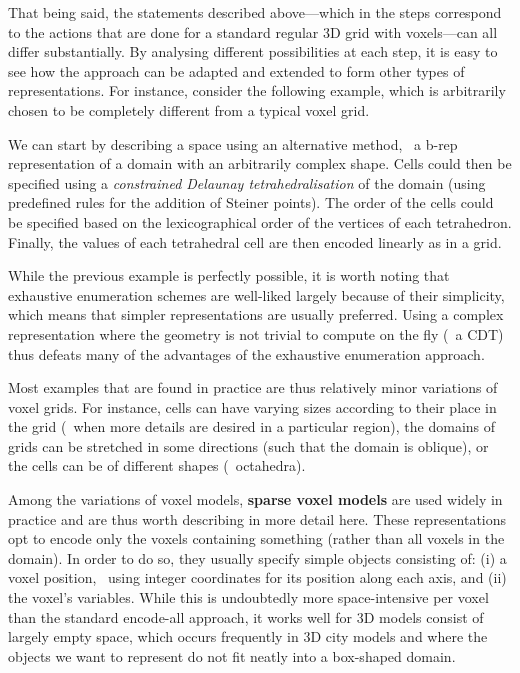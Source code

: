 That being said, the statements described above---which in the steps correspond to the actions that are done for a standard regular 3D grid with voxels---can all differ substantially.
By analysing different possibilities at each step, it is easy to see how the approach can be adapted and extended to form other types of representations.
For instance, consider the following example, which is arbitrarily chosen to be completely different from a typical voxel grid.

We can start by describing a space using an alternative method, \eg\ a b-rep representation of a domain with an arbitrarily complex shape.
Cells could then be specified using a \emph{constrained Delaunay tetrahedralisation} of the domain (using predefined rules for the addition of Steiner points).
The order of the cells could be specified based on the lexicographical order of the vertices of each tetrahedron.
Finally, the values of each tetrahedral cell are then encoded linearly as in a grid.

While the previous example is perfectly possible, it is worth noting that exhaustive enumeration schemes are well-liked largely because of their simplicity, which means that simpler representations are usually preferred.
Using a complex representation where the geometry is not trivial to compute on the fly (\eg\ a CDT) thus defeats many of the advantages of the exhaustive enumeration approach.

Most examples that are found in practice are thus relatively minor variations of voxel grids.
For instance, cells can have varying sizes according to their place in the grid (\eg\ when more details are desired in a particular region), the domains of grids can be stretched in some directions (such that the domain is oblique), or the cells can be of different shapes (\eg\ octahedra).

Among the variations of voxel models, \textbf{sparse voxel models} are used widely in practice and are thus worth describing in more detail here.
These representations opt to encode only the voxels containing something (rather than all voxels in the domain).
In order to do so, they usually specify simple objects consisting of: (i) a voxel position, \eg\ using integer coordinates for its position along each axis, and (ii) the voxel's variables.
While this is undoubtedly more space-intensive per voxel than the standard encode-all approach, it works well for 3D models consist of largely empty space, which occurs frequently in 3D city models and where the objects we want to represent do not fit neatly into a box-shaped domain.

